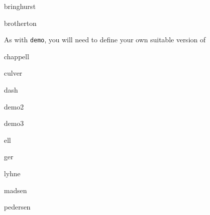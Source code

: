 \begin{showchapterstyle}{bringhurst}
\end{showchapterstyle}
\begin{showchapterstyle}{brotherton}
\end{showchapterstyle}
As with \texttt{demo}, you will need to define your own suitable
version of 


\newpage

\begin{showchapterstyle}{chappell}
\end{showchapterstyle}
\begin{showchapterstyle}{culver}
\end{showchapterstyle}
\begin{showchapterstyle}{dash}
\end{showchapterstyle}

\newpage

\begin{showchapterstyle}{demo2}
\end{showchapterstyle}

\newpage

\begin{showchapterstyle}{demo3}
\end{showchapterstyle}

\newpage

\begin{showchapterstyle}{ell}
\end{showchapterstyle}

\newpage

\begin{showchapterstyle}{ger}
\end{showchapterstyle}

\newpage

\begin{showchapterstyle}{lyhne}
\usepackage{graphicx}
\end{showchapterstyle}

\newpage

\begin{showchapterstyle}{madsen}
\usepackage{graphicx}
\end{showchapterstyle}

\newpage

\begin{showchapterstyle}{pedersen}
\usepackage{color,graphicx}
\renewcommand\colorchapnum{\color{ared}}
\renewcommand\colorchaptitle{\color{ared}}
\end{showchapterstyle}

